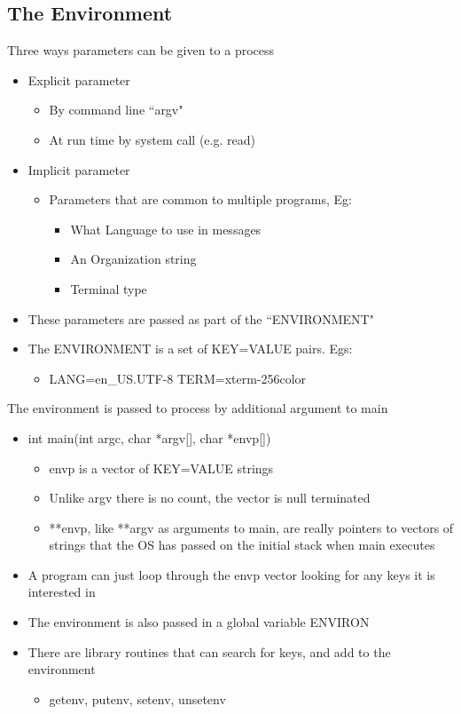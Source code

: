 \subsection{The Environment}
Three ways parameters can be given to a process
\begin{itemize}
    \item Explicit parameter
    \begin{itemize}
        \item By command line ``argv"
        \item At run time by system call (e.g. read)
    \end{itemize}
    \item Implicit parameter
    \begin{itemize}
        \item Parameters that are common to multiple programs, Eg:
        \begin{itemize}
            \item What Language to use in messages
            \item An Organization string
            \item Terminal type
        \end{itemize}
    \end{itemize}
    \item These parameters are passed as part of the ``ENVIRONMENT"
    \item The ENVIRONMENT is a set of KEY=VALUE pairs. Egs:
    \begin{itemize}
        \item LANG=en\_US.UTF-8 TERM=xterm-256color
    \end{itemize}
\end{itemize}
The environment is passed to process by additional argument to main
\begin{itemize}
    \item int main(int argc, char *argv[], char *envp[])
    \begin{itemize}
        \item envp is a vector of KEY=VALUE strings
        \item Unlike argv there is no count, the vector is null terminated
        \item **envp, like **argv as arguments to main, are really pointers to vectors of strings that the OS has passed on the initial stack when main executes
    \end{itemize}
    \item A program can just loop through the envp vector looking for any keys it is interested in
    \item The environment is also passed in a global variable ENVIRON
    \item There are library routines that can search for keys, and add to the environment
    \begin{itemize}
        \item getenv, putenv, setenv, unsetenv
    \end{itemize}
\end{itemize}
